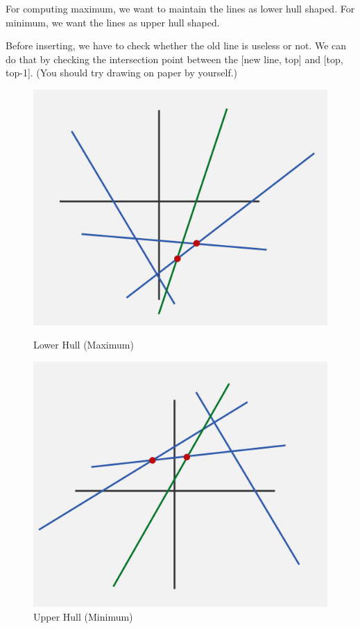 \documentclass[12pt,a4paper]{article}
\begin{document}
For computing maximum, we want to maintain the lines as lower hull shaped. For minimum, we want the lines as upper hull shaped.

Before inserting, we have to check whether the old line is useless or not. We can do that by checking the intersection point between the [new line, top] and [top, top-1]. (You should try drawing on paper by yourself.)

\begin{figure}[h]
    \centering
    \begin{minipage}{0.4\textwidth}
        \centering
        \includegraphics[width=\textwidth]{assets/cht_max.jpg}
        \caption*{Lower Hull (Maximum)}
    \end{minipage}
    \hfill
    \begin{minipage}{0.4\textwidth}
        \centering
        \includegraphics[width=\textwidth]{assets/cht_min.jpg}
        \caption*{Upper Hull (Minimum)}
    \end{minipage}
\end{figure}
\end{document}
